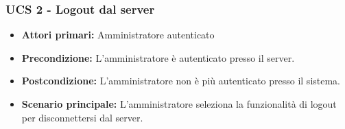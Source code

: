 
\subsubsection{UCS 2 - Logout dal server}

\begin{itemize}
\item \textbf{Attori primari:} Amministratore autenticato
\item \textbf{Precondizione:} L'amministratore è autenticato presso il server.
\item \textbf{Postcondizione:} L'amministratore non è più autenticato presso il sistema.
\item \textbf{Scenario principale:} L'amministratore seleziona la funzionalità di logout per disconnettersi dal server.
\end{itemize}

